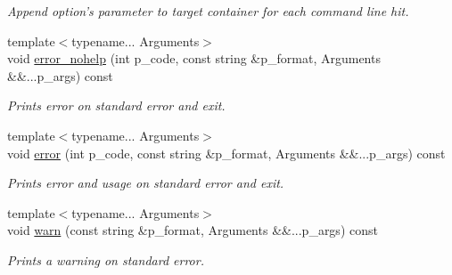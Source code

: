 \begin{DoxyCompactItemize}
\begin{DoxyCompactList}\small\item\em Append option's parameter to target container for each command line hit. \end{DoxyCompactList}\item 
{\footnotesize template$<$typename... Arguments$>$ }\\void \hyperlink{classxtd_1_1Application_a810c6c1924f762fd453555cb91cb35f9}{error\-\_\-nohelp} (int p\-\_\-code, const string \&p\-\_\-format, Arguments \&\&...p\-\_\-args) const 
\begin{DoxyCompactList}\small\item\em Prints error on standard error and exit. \end{DoxyCompactList}\item 
{\footnotesize template$<$typename... Arguments$>$ }\\void \hyperlink{classxtd_1_1Application_adf84f52f1388bef1336d0fb5f6345563}{error} (int p\-\_\-code, const string \&p\-\_\-format, Arguments \&\&...p\-\_\-args) const 
\begin{DoxyCompactList}\small\item\em Prints error and usage on standard error and exit. \end{DoxyCompactList}\item 
{\footnotesize template$<$typename... Arguments$>$ }\\void \hyperlink{classxtd_1_1Application_a931877468f6b948909d596d91d60b7a2}{warn} (const string \&p\-\_\-format, Arguments \&\&...p\-\_\-args) const 
\begin{DoxyCompactList}\small\item\em Prints a warning on standard error. \end{DoxyCompactList}\end{DoxyCompactItemize}
